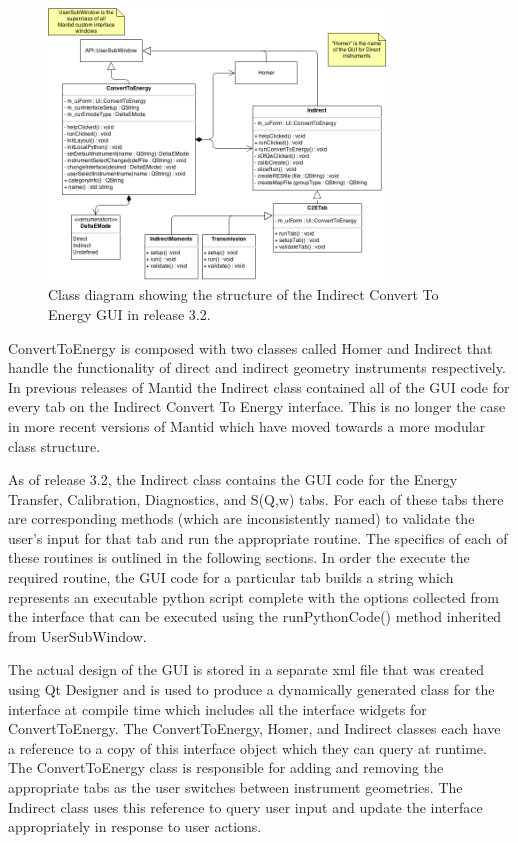 \documentclass[paper=a4, fontsize=11pt]{scrartcl}	%
\numberwithin{equation}{section}															%
\numberwithin{figure}{section}																%
\numberwithin{table}{section}																%
\begin{document}
\begin{figure}[H]
\centering
\includegraphics[width=0.8\textwidth]{img/uml/class_diagrams/C2E_structure.png}
\caption{Class diagram showing the structure of the Indirect Convert To Energy GUI in release 3.2.}
\label{fig:c2e-class-diagram}
\end{figure}

ConvertToEnergy is composed with two classes called Homer and Indirect that handle the functionality of direct and indirect geometry instruments respectively. In previous releases of Mantid the Indirect class contained all of the GUI code for every tab on the Indirect Convert To Energy interface. This is no longer the case in more recent versions of Mantid which have moved towards a more modular class structure.

As of release 3.2, the Indirect class contains the GUI code for the Energy Transfer, Calibration, Diagnostics, and S(Q,w) tabs. For each of these tabs there are corresponding methods (which are inconsistently named) to validate the user's input for that tab and run the appropriate routine. The specifics of each of these routines is outlined in the following sections. In order the execute the required routine, the GUI code for a particular tab builds a string which represents an executable python script complete with the options collected from the interface that can be executed using the runPythonCode() method inherited from UserSubWindow.

The actual design of the GUI is stored in a separate xml file that was created using Qt Designer and is used to produce a dynamically generated class for the interface at compile time which includes all the interface widgets for ConvertToEnergy. The ConvertToEnergy, Homer, and Indirect classes each have a reference to a copy of this interface object which they can query at runtime. The ConvertToEnergy class is responsible for adding and removing the appropriate tabs as the user switches between instrument geometries. The Indirect class uses this reference to query user input and update the interface appropriately in response to user actions.
\end{document}

